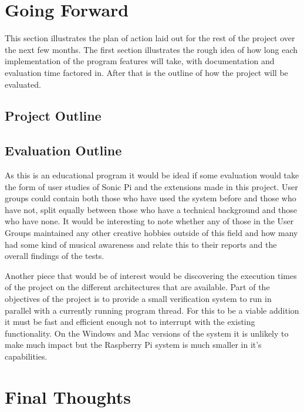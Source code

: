 \documentclass[11pt]{scrartcl}
\begin{document}
\section{Going Forward}
This section illustrates the plan of action laid out for the rest of the 
project over the next few months. The first section illustrates the rough
idea of how long each implementation of the program features will take, 
with documentation and evaluation time factored in. After that is the 
outline of how the project will be evaluated.

\subsection{Project Outline}

\subsection{Evaluation Outline}
As this is an educational program it would be ideal if some evaluation would 
take the form of user studies of Sonic Pi and the extensions made in this 
project. User groups could contain both those who have used the system before 
and those who have not, split equally between those who have a technical 
background and those who have none. It would be interesting to note whether 
any of those in the User Groups maintained any other creative hobbies outside 
of this field and how many had some kind of musical awareness and relate this 
to their reports and the overall findings of the tests.

Another piece that would be of interest would be discovering the execution 
times of the project on the different architectures that are available. Part 
of the objectives of the project is to provide a small verification system to 
run in parallel with a currently running program thread. For this to be a 
viable addition it must be fast and efficient enough not to interrupt with the 
existing functionality. On the Windows and Mac versions of the system it is 
unlikely to make much impact but the Raspberry Pi system is much smaller in 
it's capabilities.

\section{Final Thoughts}
\end{document}

